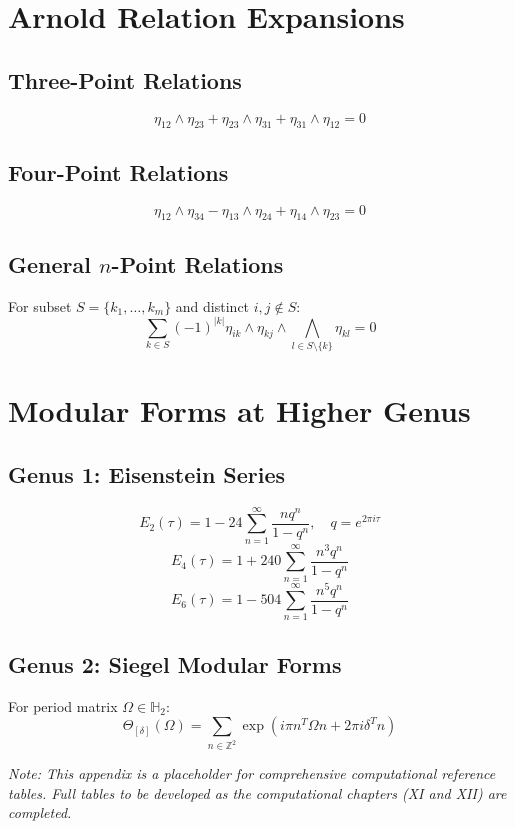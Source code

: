 \section{Arnold Relation Expansions}

\subsection{Three-Point Relations}

$$\eta_{12} \wedge \eta_{23} + \eta_{23} \wedge \eta_{31} + \eta_{31} \wedge \eta_{12} = 0$$

\subsection{Four-Point Relations}

$$\eta_{12} \wedge \eta_{34} - \eta_{13} \wedge \eta_{24} + \eta_{14} \wedge \eta_{23} = 0$$

\subsection{General $n$-Point Relations}

For subset $S = \{k_1, \ldots, k_m\}$ and distinct $i, j \notin S$:
$$\sum_{k \in S} (-1)^{|k|} \eta_{ik} \wedge \eta_{kj} \wedge \bigwedge_{l \in S \setminus \{k\}} \eta_{kl} = 0$$

\section{Modular Forms at Higher Genus}

\subsection{Genus 1: Eisenstein Series}

$$E_2(\tau) = 1 - 24\sum_{n=1}^\infty \frac{nq^n}{1-q^n}, \quad q = e^{2\pi i \tau}$$
$$E_4(\tau) = 1 + 240\sum_{n=1}^\infty \frac{n^3q^n}{1-q^n}$$
$$E_6(\tau) = 1 - 504\sum_{n=1}^\infty \frac{n^5q^n}{1-q^n}$$

\subsection{Genus 2: Siegel Modular Forms}

For period matrix $\Omega \in \mathbb{H}_2$:
$$\Theta_{[\delta]}(\Omega) = \sum_{n \in \mathbb{Z}^2} \exp(i\pi n^T \Omega n + 2\pi i \delta^T n)$$

\textit{Note: This appendix is a placeholder for comprehensive computational reference tables. Full tables to be developed as the computational chapters (XI and XII) are completed.}

